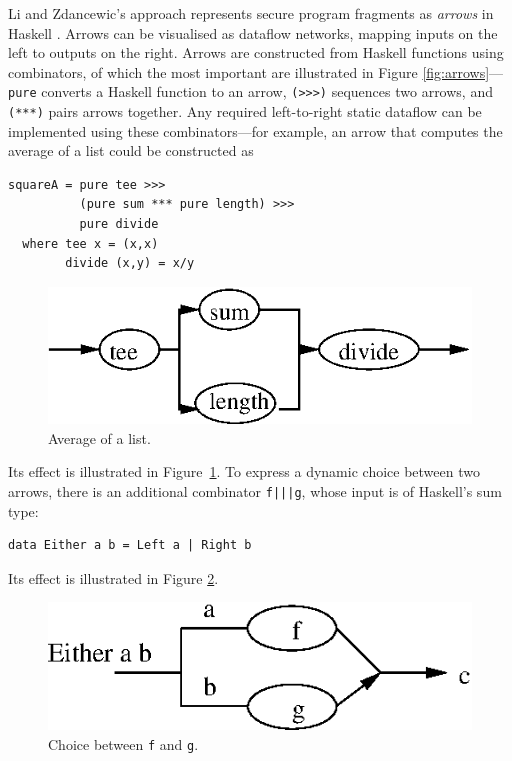 \documentclass[times, 10pt,twocolumn]{article}
\begin{document}
Li and Zdancewic's approach represents secure program fragments as {\em
  arrows} in Haskell \cite{hughes00generalising}. Arrows can be visualised as
dataflow networks, mapping inputs on the left to outputs on the right.
Arrows are constructed from Haskell functions using combinators, of
which the most important are illustrated in Figure
\ref{fig:arrows}---\verb!pure! converts a Haskell function to an
arrow, \verb!(>>>)! sequences two arrows, and \verb!(***)! pairs
arrows together. Any required left-to-right static dataflow can be
implemented using these combinators---for example, an arrow that
computes the average of a list could be constructed as
\begin{Verbatim}[fontsize=\footnotesize]
squareA = pure tee >>> 
          (pure sum *** pure length) >>> 
          pure divide
  where tee x = (x,x)
        divide (x,y) = x/y
\end{Verbatim}
\begin{figure}
\begin{center}
\includegraphics{average.eps}
\end{center}
\caption{Average of a list.} \label{fig:average}
\end{figure}
Its effect is illustrated in Figure~\ref{fig:average}.
To express a dynamic choice between two arrows, there is an additional
combinator \verb!f|||g!, whose input is of Haskell's sum type:
\begin{Verbatim}[fontsize=\footnotesize]
data Either a b = Left a | Right b
\end{Verbatim}
Its effect is illustrated in Figure \ref{fig:choice}.
\begin{figure}
\begin{center}
\includegraphics{choice.eps}
\caption{Choice between {\tt f} and {\tt g}.} \label{fig:choice}
\end{center}
\end{figure}
\end{document}
